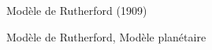 \documentclass[handout,8pt]{beamer} %
\begin{document}
\begin{frame}{Modèle de Rutherford (1909)}
\begin{block}{Modèle de Rutherford, Modèle planétaire}
                                                                                                                                                                                                                                                                                                                                                                                                                                                                                                                                                                                                                                                                                                                                                                                                                                                                                                                                                                                                                                                                                                                                                                                                                                                                                                                                                                                                                                                                                                                                                                                                                                                                                                                                                                                                                                                                                                                                                                                                                                                                                                                                                                                                                                                                                                                                                                                                                                                                                                                                                                                                                                                                                                                                                                                                                                                                                                                                                                                                                                                                                                                                                                                                                                                                                    

\end{block}
\end{frame}
\end{document}
